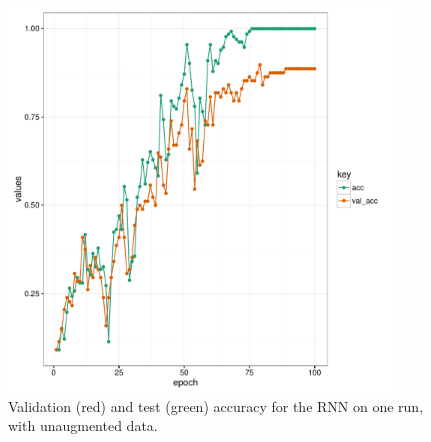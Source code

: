 \begin{figure}[h]
\begin{center}
\includegraphics[height = 4in, width = 4in]{rnn_2d_plot_acc.pdf}
\end{center}
\caption{Validation (red) and test (green) accuracy for the RNN on one run, with unaugmented data.}
\label{fig:2d_rnn_acc}
\end{figure}
